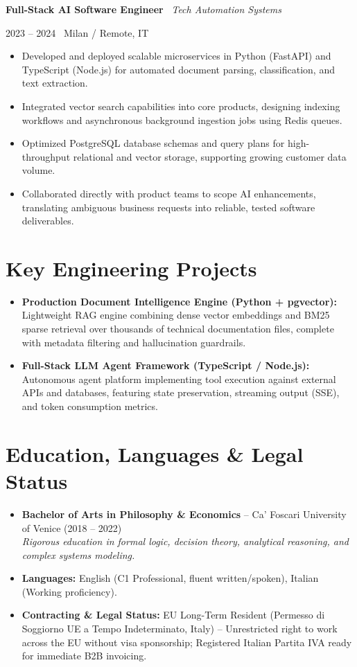 \documentclass[a4paper,10pt]{article}
\newcommand{\role}[4]{%
  \vspace{2pt}\noindent
  \begin{minipage}[t]{0.70\textwidth}\raggedright\textbf{#1} \textbullet\ \textit{#3}\end{minipage}%
  \hfill
  \begin{minipage}[t]{0.28\textwidth}\raggedleft\footnotesize\color{gray}#2 \textbullet\ #4\end{minipage}%
  \vspace{1pt}%
}
\begin{document}
\vspace{3pt}
\role{Full-Stack AI Software Engineer}{2023 -- 2024}{Tech Automation Systems}{Milan / Remote, IT}
\begin{itemize}
  \item Developed and deployed scalable microservices in Python (FastAPI) and TypeScript (Node.js) for automated document parsing, classification, and text extraction.
  \item Integrated vector search capabilities into core products, designing indexing workflows and asynchronous background ingestion jobs using Redis queues.
  \item Optimized PostgreSQL database schemas and query plans for high-throughput relational and vector storage, supporting growing customer data volume.
  \item Collaborated directly with product teams to scope AI enhancements, translating ambiguous business requests into reliable, tested software deliverables.
\end{itemize}

\section{Key Engineering Projects}
\begin{itemize}
  \item \textbf{Production Document Intelligence Engine (Python + pgvector):} Lightweight RAG engine combining dense vector embeddings and BM25 sparse retrieval over thousands of technical documentation files, complete with metadata filtering and hallucination guardrails.
  \item \textbf{Full-Stack LLM Agent Framework (TypeScript / Node.js):} Autonomous agent platform implementing tool execution against external APIs and databases, featuring state preservation, streaming output (SSE), and token consumption metrics.
\end{itemize}

\section{Education, Languages \& Legal Status}
\begin{itemize}
  \item \textbf{Bachelor of Arts in Philosophy \& Economics} -- Ca' Foscari University of Venice (2018 -- 2022) \\
  \textit{Rigorous education in formal logic, decision theory, analytical reasoning, and complex systems modeling.}
  \item \textbf{Languages:} English (C1 Professional, fluent written/spoken), Italian (Working proficiency).
  \item \textbf{Contracting \& Legal Status:} EU Long-Term Resident (Permesso di Soggiorno UE a Tempo Indeterminato, Italy) -- Unrestricted right to work across the EU without visa sponsorship; Registered Italian Partita IVA ready for immediate B2B invoicing.
\end{itemize}
\end{document}
